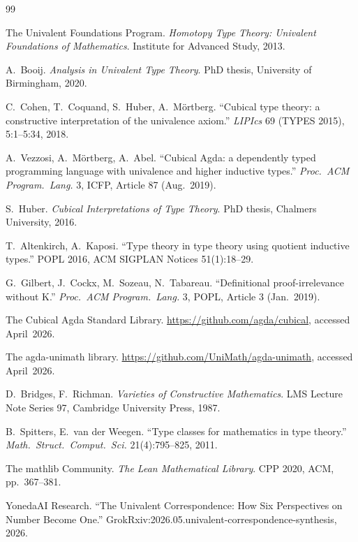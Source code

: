 \documentclass[12pt]{article}
\theoremstyle{definition}
\theoremstyle{remark}
\begin{document}
\begin{thebibliography}{99}

The Univalent Foundations Program.
\emph{Homotopy Type Theory: Univalent Foundations of Mathematics}.
Institute for Advanced Study, 2013.

A.~Booij.
\emph{Analysis in Univalent Type Theory}.
PhD thesis, University of Birmingham, 2020.

C.~Cohen, T.~Coquand, S.~Huber, A.~M{\"o}rtberg.
``Cubical type theory: a constructive interpretation of the univalence axiom.''
\emph{LIPIcs} 69 (TYPES 2015), 5:1--5:34, 2018.

A.~Vezzosi, A.~M{\"o}rtberg, A.~Abel.
``Cubical Agda: a dependently typed programming language with univalence and higher inductive types.''
\emph{Proc.\ ACM Program.\ Lang.} 3, ICFP, Article 87 (Aug.~2019).

S.~Huber.
\emph{Cubical Interpretations of Type Theory}.
PhD thesis, Chalmers University, 2016.

T.~Altenkirch, A.~Kaposi.
``Type theory in type theory using quotient inductive types.''
POPL 2016, ACM SIGPLAN Notices 51(1):18--29.

G.~Gilbert, J.~Cockx, M.~Sozeau, N.~Tabareau.
``Definitional proof-irrelevance without K.''
\emph{Proc.\ ACM Program.\ Lang.} 3, POPL, Article 3 (Jan.~2019).

The Cubical Agda Standard Library.
\url{https://github.com/agda/cubical}, accessed April~2026.

The agda-unimath library.
\url{https://github.com/UniMath/agda-unimath}, accessed April~2026.

D.~Bridges, F.~Richman.
\emph{Varieties of Constructive Mathematics}.
LMS Lecture Note Series 97, Cambridge University Press, 1987.

B.~Spitters, E.~van der Weegen.
``Type classes for mathematics in type theory.''
\emph{Math.\ Struct.\ Comput.\ Sci.} 21(4):795--825, 2011.

The mathlib Community.
\emph{The Lean Mathematical Library}.
CPP 2020, ACM, pp.~367--381.

YonedaAI Research.
``The Univalent Correspondence: How Six Perspectives on Number Become One.''
GrokRxiv:2026.05.univalent-correspondence-synthesis, 2026.


\end{thebibliography}
\end{document}

